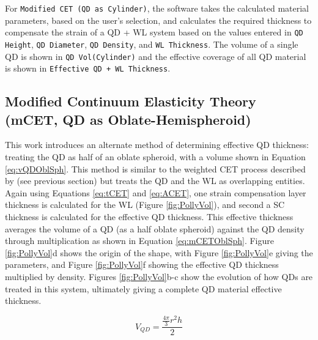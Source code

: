 \documentclass{article}
\begin{document}
For \texttt{Modified CET (QD as Cylinder)}, the software takes the calculated material parameters, based on the user's selection, and calculates the required thickness to compensate the strain of a QD + WL system based on the values entered in \texttt{QD Height}, \texttt{QD Diameter}, \texttt{QD Density}, and \texttt{WL Thickness}. The volume of a single QD is shown in \texttt{QD Vol(Cylinder)} and the effective coverage of all QD material is shown in \texttt{Effective QD + WL Thickness}.
\FloatBarrier
\subsection{Modified Continuum Elasticity Theory (mCET, QD as Oblate-Hemispheroid)}

This work introduces an alternate method of determining effective QD thickness: treating the QD as half of an oblate spheroid, with a volume shown in Equation \ref{eq:vQDOblSph}. This method is similar to the weighted CET process described by \citeauthor{bailey_evaluation_2009} (see previous section) but treats the QD and the WL as overlapping entities. Again using Equations \ref{eq:tCET} and \ref{eq:ACET}, one strain compensation layer thickness is calculated for the WL (Figure \ref{fig:PollyVol}), and second a SC thickness is calculated for the effective QD thickness. This effective thickness averages the volume of a QD (as a half oblate spheroid) against the QD density through multiplication as shown in Equation \ref{eq:mCETOblSph}. Figure \ref{fig:PollyVol}d shows the origin of the shape, with Figure \ref{fig:PollyVol}e giving the parameters, and Figure \ref{fig:PollyVol}f showing the effective QD thickness multiplied by density. Figures \ref{fig:PollyVol}b-c show the evolution of how QDs are treated in this system, ultimately giving a complete QD material effective thickness.

\begin{equation}
\label{eq:vQDOblSph}
V_{QD}=\frac{\frac{4\pi}{3}r^{2}h}{2}
\end{equation}
\end{document}
